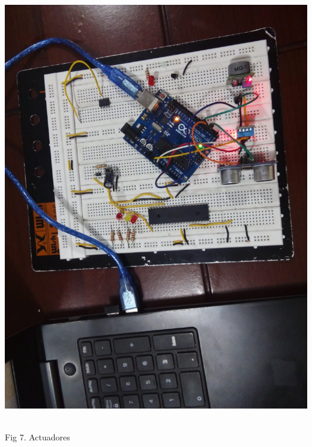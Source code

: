 \documentclass[12pt]{report}
\begin{document}
 \begin{center}
\includegraphics[scale=0.25]{Documento/Figuras/Sensores.jpeg}
\begin{scriptsize}\\ 
Fig 7. Actuadores
\end{scriptsize}
\end{center}
\end{document}
